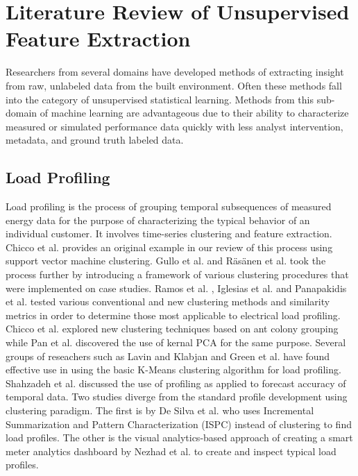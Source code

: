 \section{Literature Review of Unsupervised Feature Extraction}

Researchers from several domains have developed methods of extracting insight from raw, unlabeled data from the built environment. Often these methods fall into the category of unsupervised statistical learning. Methods from this sub-domain of machine learning are advantageous due to their ability to characterize measured or simulated performance data quickly with less analyst intervention, metadata, and ground truth labeled data. 

\subsection{Load Profiling}
Load profiling is the process of grouping temporal subsequences of measured energy data for the purpose of characterizing the typical behavior of an individual customer. It involves time-series clustering and feature extraction. Chicco et al. \cite{chicco_support_2009} provides an original example in our review of this process using support vector machine clustering. Gullo et al. \cite{gullo_low-voltage_2009} and R\"as\"anen et al. \cite{rasanen_feature-based_2009} took the process further by introducing a framework of various clustering procedures that were implemented on case studies. Ramos et al. \cite{ramos_typical_2012}, Iglesias et al. \cite{iglesias_analysis_2013} and Panapakidis et al. \cite{panapakidis_evaluation_2015} tested various conventional and new clustering methods and similarity metrics in order to determine those most applicable to electrical load profiling. Chicco et al. \cite{chicco_electrical_2013} explored new clustering techniques based on ant colony grouping while Pan et al. \cite{pan_kernel-based_2015} discovered the use of kernal PCA for the same purpose. Several groups of reseachers such as Lavin and Klabjan \cite{lavin_clustering_2014} and Green et al. \cite{green_divide_2014} have found effective use in using the basic K-Means clustering algorithm for load profiling. Shahzadeh et al. \cite{shahzadeh_improving_2015} discussed the use of profiling as applied to forecast accuracy of temporal data. Two studies diverge from the standard profile development using clustering paradigm. The first is by De Silva et al. \cite{de_silva_data_2011} who uses Incremental Summarization and Pattern Characterization (ISPC) instead of clustering to find load profiles. The other is the visual analytics-based approach of creating a smart meter analytics dashboard by Nezhad et al. \cite{jarrah_nezhad_smartd:_2014} to create and inspect typical load profiles.

